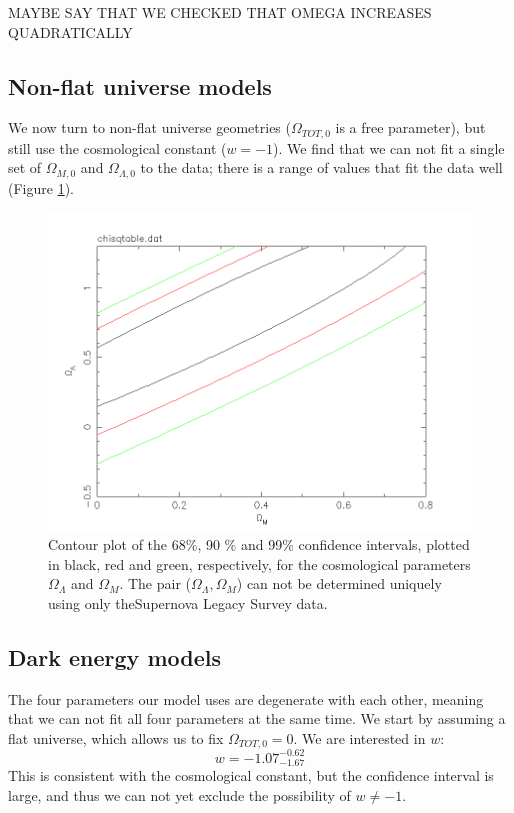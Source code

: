 \documentclass[11pt]{article}
\begin{document}
MAYBE SAY THAT WE CHECKED THAT OMEGA INCREASES QUADRATICALLY



\subsection{Non-flat universe models}
We now turn to non-flat universe geometries ($\Omega_{TOT,0} $ is a free parameter), but still use the cosmological constant ($w = -1$). We find that we can not fit a single set of $\Omega_{M,0}$ and $\Omega_{\Lambda,0}$ to the data; there is a range of values that fit the data well (Figure \ref{fig:nonflat}). 
\begin{figure}[htbp]
	\centering
	\includegraphics[width=0.8\linewidth]{nonflat.png}
	\caption{Contour plot of the 68\%, 90 \% and 99\% confidence intervals, plotted in black, red and green, respectively, for the cosmological parameters $\Omega_\Lambda$ and $\Omega_M$. The pair ($\Omega_\Lambda, \Omega_M$) can not be determined uniquely using only theSupernova Legacy Survey data.}
	\label{fig:nonflat}
\end{figure}

\subsection{Dark energy models}
The four parameters our model uses are degenerate with each other, meaning that we can not fit all four parameters at the same time. We start by assuming a flat universe, which allows us to fix $\Omega_{TOT,0} = 0$. We are interested in $w$:
\begin{equation}
	w= -1.07^{-0.62}_{-1.67}
	\label{res:w}
\end{equation}
This is consistent with the cosmological constant, but the confidence interval is large, and thus we can not yet exclude the possibility of $w \neq -1$.
\end{document}
